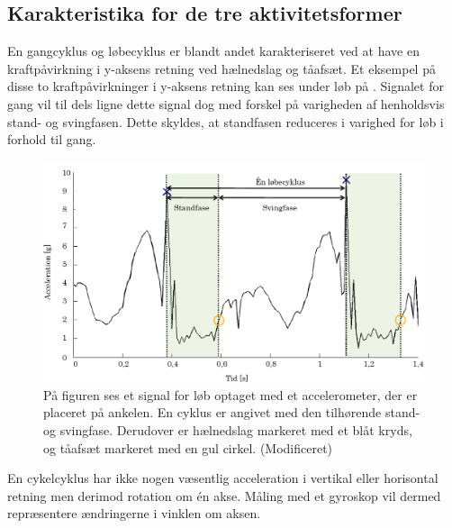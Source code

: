 \subsection{Karakteristika for de tre aktivitetsformer}
En gangcyklus og løbecyklus er blandt andet karakteriseret ved at have en kraftpåvirkning i y-aksens retning ved hælnedslag og tåafsæt. Et eksempel på disse to kraftpåvirkninger i y-aksens retning kan ses under løb på . Signalet for gang vil til dels ligne dette signal dog med forskel på varigheden af henholdsvis stand- og svingfasen. Dette skyldes, at standfasen reduceres i varighed for løb i forhold til gang. %
\begin{figure}[H]
	\centering
	\includegraphics[scale=0.55]{figures/bProblemloesning/loeb_skolebog.png}
	\caption{På figuren ses et signal for løb optaget med et accelerometer, der er placeret på ankelen. En cyklus er angivet med den tilhørende stand- og svingfase. Derudover er hælnedslag markeret med et blåt kryds, og tåafsæt markeret med en gul cirkel. \citep{WeyandKelly2001} (Modificeret)}
	\label{fig:loeb_skolebog}
\end{figure}
En cykelcyklus har ikke nogen væsentlig acceleration i vertikal eller horisontal retning men derimod rotation om én akse. Måling med et gyroskop vil dermed repræsentere ændringerne i vinklen om aksen. \citep{Cockcroft2011,Marin-PerianuMarin-Perianu2013}


